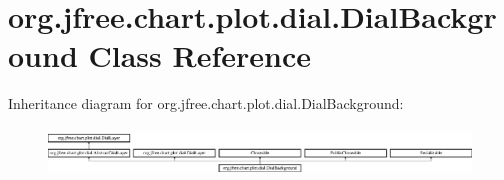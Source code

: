 \hypertarget{classorg_1_1jfree_1_1chart_1_1plot_1_1dial_1_1_dial_background}{}\section{org.\+jfree.\+chart.\+plot.\+dial.\+Dial\+Background Class Reference}
\label{classorg_1_1jfree_1_1chart_1_1plot_1_1dial_1_1_dial_background}
Inheritance diagram for org.\+jfree.\+chart.\+plot.\+dial.\+Dial\+Background\+:\begin{figure}[H]
\begin{center}
\leavevmode
\includegraphics[height=1.312500cm]{classorg_1_1jfree_1_1chart_1_1plot_1_1dial_1_1_dial_background}
\end{center}
\end{figure}
